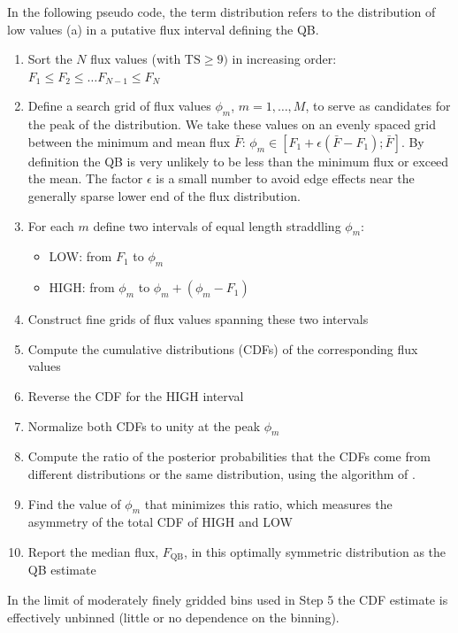 \documentclass[twocolumn,linenumbers]{aastex62}
\begin{document}
In the following pseudo code, the term distribution
refers to the distribution of low values (a) in a putative
flux interval defining the QB.
\begin{enumerate}
\item Sort the $N$ flux values (with $\mathrm{TS} \geqslant 9)$ in increasing order:
$F_{1} \leqslant F_{2} \leqslant \dots F_{N-1}   \leqslant F_{N} $
\item Define a search grid of flux values $\phi_{m}$, $m = 1,\ldots,M$, 
to serve as candidates for the peak of the distribution. We take these 
values on an evenly spaced grid between the minimum and mean flux $\bar{F}$:
$\phi_m \in [F_1 + \epsilon (\bar{F} - F_1); \bar{F}]$.
By definition the QB is very unlikely to be less than the
minimum flux or exceed the mean.
The factor $\epsilon$ is a small number to  avoid edge effects 
near the generally sparse lower end of the flux distribution.
\item For each $m$ define two intervals  of equal length straddling  $\phi_m$: 
    \begin{itemize}
    \item LOW: from $F_{1}$ to $\phi_m$
    \item HIGH: from $\phi_m$ to $\phi_m + (\phi_m - F_{1})$
    \end{itemize}

\item Construct fine grids of flux values spanning these two intervals
\item Compute the cumulative distributions (CDFs) of the
corresponding flux values 
\item Reverse the  CDF for the HIGH interval 
\item Normalize both CDFs to unity at the peak $\phi_m$
\item Compute the ratio of the posterior probabilities that the CDFs come from different distributions or the same distribution,  using the algorithm of \citet{Wolpert1996}.
\item Find the value of $\phi_m$ that minimizes this ratio, which measures the asymmetry of the total CDF of HIGH and LOW
\item Report the median flux, $F_\mathrm{QB}$, in this
optimally symmetric distribution as the QB estimate
\end{enumerate}
\noindent
In the limit of moderately finely gridded bins 
used in Step 5 the CDF estimate is effectively
unbinned (little or no dependence
on the binning).
\end{document}
